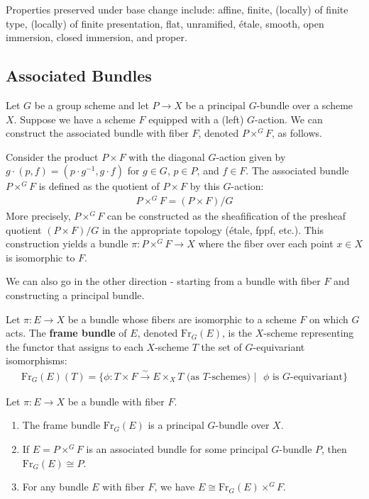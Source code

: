 \documentclass[12pt]{article}
\begin{document}
Properties preserved under base change include: affine, finite, (locally) of finite type, (locally) of finite presentation, flat, unramified, étale, smooth, open immersion, closed immersion, and proper.
\subsection{Associated Bundles}

Let $G$ be a group scheme and let $P \to X$ be a principal $G$-bundle over a scheme $X$. Suppose we have a scheme $F$ equipped with a (left) $G$-action. We can construct the associated bundle with fiber $F$, denoted $P \times^G F$, as follows.

Consider the product $P \times F$ with the diagonal $G$-action given by $g \cdot (p, f) = (p \cdot g^{-1}, g \cdot f)$ for $g \in G$, $p \in P$, and $f \in F$. The associated bundle $P \times^G F$ is defined as the quotient of $P \times F$ by this $G$-action:
\begin{align*}
    P \times^G F = (P \times F)/G
\end{align*}
More precisely, $P \times^G F$ can be constructed as the sheafification of the presheaf quotient $(P \times F)/G$ in the appropriate topology (étale, fppf, etc.). This construction yields a bundle $\pi: P \times^G F \to X$ where the fiber over each point $x \in X$ is isomorphic to $F$.

We can also go in the other direction - starting from a bundle with fiber $F$ and constructing a principal bundle.

\begin{definition}
    Let $\pi: E \to X$ be a bundle whose fibers are isomorphic to a scheme $F$ on which $G$ acts. The \textbf{frame bundle} of $E$, denoted $\text{Fr}_G(E)$, is the $X$-scheme representing the functor that assigns to each $X$-scheme $T$ the set of $G$-equivariant isomorphisms:
    \begin{align*}
        \text{Fr}_G(E)(T) = \{\phi: T \times F \stackrel{\sim}{\to} E \times_X T \text{ (as $T$-schemes) } | \text{ $\phi$ is $G$-equivariant}\}
    \end{align*}
\end{definition}

\begin{proposition}
    Let $\pi: E \to X$ be a bundle with fiber $F$.
    \begin{enumerate}
        \item The frame bundle $\text{Fr}_G(E)$ is a principal $G$-bundle over $X$.
        \item If $E = P \times^G F$ is an associated bundle for some principal $G$-bundle $P$, then $\text{Fr}_G(E) \cong P$.
        \item For any bundle $E$ with fiber $F$, we have $E \cong \text{Fr}_G(E) \times^G F$.
    \end{enumerate}
\end{proposition}
\end{document}
